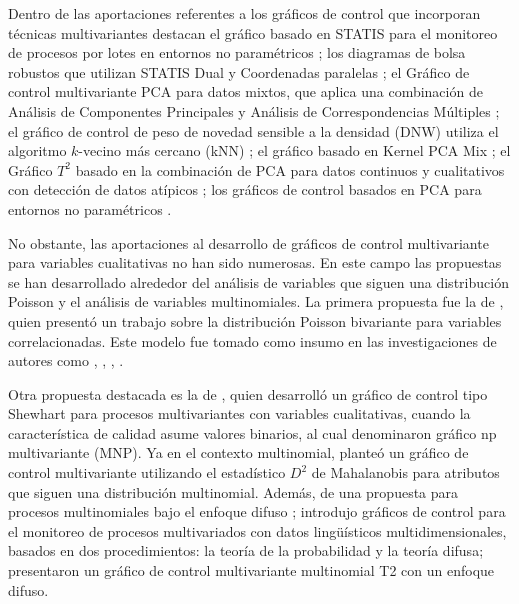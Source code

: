 \documentclass[mathematics,article,submit,moreauthors,pdftex]{mdpi}
\begin{document}
Dentro de las aportaciones referentes a los gráficos de control que
incorporan técnicas multivariantes destacan el gráfico basado en STATIS
para el monitoreo de procesos por lotes en entornos no paramétricos
\citep{filho2016multivariate}; los diagramas de bolsa robustos que
utilizan STATIS Dual y Coordenadas paralelas \citep{RamosBarberan2018};
el Gráfico de control multivariante PCA para datos mixtos, que aplica
una combinación de Análisis de Componentes Principales y Análisis de
Correspondencias Múltiples \citep{Muhammad2018}; el gráfico de control
de peso de novedad sensible a la densidad (DNW) utiliza el algoritmo
\(k\)-vecino más cercano (kNN) \citep{liu2020}; el gráfico basado en
Kernel PCA Mix \citep{Ahsan2020, Ahsan2022}; el Gráfico \(T^2\) basado
en la combinación de PCA para datos continuos y cualitativos con
detección de datos atípicos \citep{Ahsan2021}; los gráficos de control
basados en PCA para entornos no paramétricos
\citep{Farokhnia, liu2020nonparametric}.

No obstante, las aportaciones al desarrollo de gráficos de control
multivariante para variables cualitativas no han sido numerosas. En este
campo las propuestas se han desarrollado alrededor del análisis de
variables que siguen una distribución Poisson y el análisis de variables
multinomiales. La primera propuesta fue la de \citet{holgate1964}, quien
presentó un trabajo sobre la distribución Poisson bivariante para
variables correlacionadas. Este modelo fue tomado como insumo en las
investigaciones de autores como \citet{chiu2007}, \citet{ho2009},
\citet{laungrungrong2011ewma}, \citet{epprecht2013optimal}.

Otra propuesta destacada es la de \citet{lu1998control}, quien
desarrolló un gráfico de control tipo Shewhart para procesos
multivariantes con variables cualitativas, cuando la característica de
calidad asume valores binarios, al cual denominaron gráfico np
multivariante (MNP). Ya en el contexto multinomial,
\citet{ranjan2008multivariate} planteó un gráfico de control
multivariante utilizando el estadístico \(D^2\) de Mahalanobis para
atributos que siguen una distribución multinomial. Además, de una
propuesta para procesos multinomiales bajo el enfoque difuso
\citep{taleb2006multivariate}; \citet{taleb2009control} introdujo
gráficos de control para el monitoreo de procesos multivariados con
datos lingüísticos multidimensionales, basados en dos procedimientos: la
teoría de la probabilidad y la teoría difusa;
\citet{pastuizaca2015multivariate} presentaron un gráfico de control
multivariante multinomial T2 con un enfoque difuso.
\end{document}

